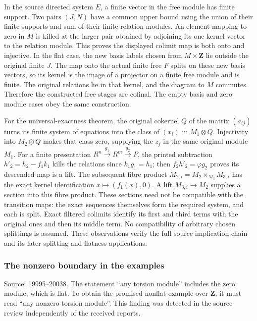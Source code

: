 In the source directed system \(E\), a finite vector in the free module has finite support. Two pairs \((J,N)\) have a common upper bound using the union of their finite supports and sum of their finite relation modules. An element mapping to zero in \(M\) is killed at the larger pair obtained by adjoining its one kernel vector to the relation module. This proves the displayed colimit map is both onto and injective. In the flat case, the new basis labels chosen from \(M\times\mathbf Z\) lie outside the original finite \(J\). The map onto the actual finite free \(F\) splits on these new basis vectors, so its kernel is the image of a projector on a finite free module and is finite. The original relations lie in that kernel, and the diagram to \(M\) commutes. Therefore the constructed free stages are cofinal. The empty basis and zero module cases obey the same construction.

For the universal-exactness theorem, the original cokernel \(Q\) of the matrix \((a_{ij})\) turns its finite system of equations into the class of \((x_i)\) in \(M_1\otimes Q\). Injectivity into \(M_2\otimes Q\) makes that class zero, supplying the \(z_j\) in the same original module \(M_1\). For a finite presentation \(R^n\xrightarrow{g_1}R^m\xrightarrow{g_2}P\), the printed subtraction \(h'_2=h_2-f_1k_1\) kills the relations since \(k_1g_1=h_1\); then \(f_2h'_2=\varphi g_2\) proves its descended map is a lift. The subsequent fibre product \(M_{2,i}=M_2\times_{M_3}M_{3,i}\) has the exact kernel identification \(x\mapsto(f_1(x),0)\). A lift \(M_{3,i}\to M_2\) supplies a section into this fibre product. These sections need not be compatible with the transition maps: the exact sequences themselves form the required system, and each is split. Exact filtered colimits identify its first and third terms with the original ones and then its middle term. No compatibility of arbitrary chosen splittings is assumed. These observations verify the full source implication chain and its later splitting and flatness applications.

\subsubsection{The nonzero boundary in the examples}\label{the-nonzero-boundary-in-the-examples}

Source: 19995--20038. The statement ``any torsion module'' includes the zero module, which is flat. To obtain the promised nonflat example over \(\mathbf Z\), it must read ``any nonzero torsion module''. This finding was detected in the source review independently of the received reports.

